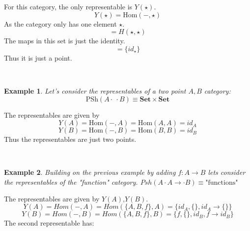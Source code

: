 \documentclass[twoside]{article}
\newtheorem{ex}{Example}[section]
\newcommand{\Hom}{\mathrm{Hom}}
\newcommand{\PSh}{\mathrm{PSh}}
\begin{document}
For this category, the only representable is $Y(\star)$.
$$Y(\star) = \Hom(-,\star)$$
As the category only has one element $\star$.
$$ = H (\star,\star) $$
The maps in this set is just the identity.
$$ = \{ id_{\star } \} $$
Thus it is just a point.\\

\begin{figure}[!h]
  \centering
{}\\
\end{figure}

\begin{ex}
Let's consider the representables of a two point $A,B$ category:
$$\PSh(A \cdot \: \cdot B ) \equiv \mathbf{Set} \times \mathbf{Set} $$
\end{ex}
The representables are given by
$$Y(A)=\Hom(-,A)=\Hom(A,A)=id_{A}$$
$$Y(B)=\Hom(-,B)=\Hom(B,B)=id_{B}$$
Thus the representables are just two points.\\

\begin{figure}[!h]
  \centering
{}\\
\end{figure}

\begin{ex}
Building on the previous example by adding $f : A \rightarrow B$ lets
consider the representables of the "function" category.
$Psh(A \cdot A  \rightarrow \cdot B )   \equiv \mbox{"functions"}$\\
\end{ex}
The representables are given by $Y(A)$,$Y(B)$.
$$Y(A)=Hom(-,A)=Hom(\{A,B,f\},A)=\{id_{A},\{\},id_{A} \rightarrow \{\} \}$$
$$Y(B)=Hom(-,B)=Hom(\{A,B,f\},B)=\{f,\{\},id_{B},f \rightarrow id_{B} \}$$
The second representable has:
\end{document}

